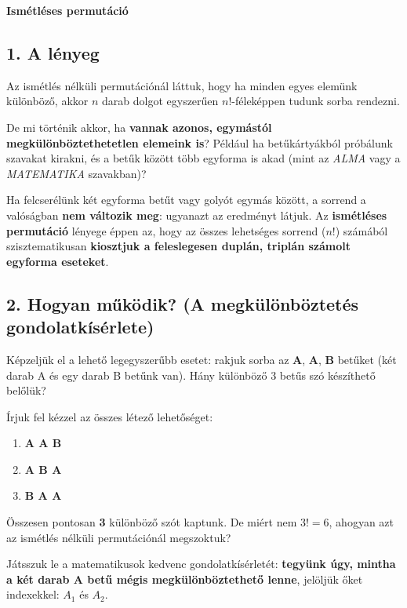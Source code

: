 \documentclass[11pt, a4paper]{article}
\begin{document}
\begin{center}
    \LARGE \textbf{Ismétléses permutáció} \\
    \vspace{0.5cm}
\end{center}

\vspace{0.3cm}

\subsection*{1. A lényeg}
Az ismétlés nélküli permutációnál láttuk, hogy ha minden egyes elemünk különböző, akkor $n$ darab dolgot egyszerűen $n!$-féleképpen tudunk sorba rendezni.

De mi történik akkor, ha \textbf{vannak azonos, egymástól megkülönböztethetetlen elemeink is}? Például ha betűkártyákból próbálunk szavakat kirakni, és a betűk között több egyforma is akad (mint az \textit{ALMA} vagy a \textit{MATEMATIKA} szavakban)?

Ha felcserélünk két egyforma betűt vagy golyót egymás között, a sorrend a valóságban \textbf{nem változik meg}: ugyanazt az eredményt látjuk. Az \textbf{ismétléses permutáció} lényege éppen az, hogy az összes lehetséges sorrend ($n!$) számából szisztematikusan \textbf{kiosztjuk a feleslegesen duplán, triplán számolt egyforma eseteket}.

\subsection*{2. Hogyan működik? (A megkülönböztetés gondolatkísérlete)}
Képzeljük el a lehető legegyszerűbb esetet: rakjuk sorba az \textbf{A}, \textbf{A}, \textbf{B} betűket (két darab A és egy darab B betűnk van). Hány különböző 3 betűs szó készíthető belőlük? 

Írjuk fel kézzel az összes létező lehetőséget:
\begin{enumerate}
    \item \textbf{A A B}
    \item \textbf{A B A}
    \item \textbf{B A A}
\end{enumerate}
Összesen pontosan \textbf{3} különböző szót kaptunk. De miért nem $3! = 6$, ahogyan azt az ismétlés nélküli permutációnál megszoktuk?

Játsszuk le a matematikusok kedvenc gondolatkísérletét: \textbf{tegyünk úgy, mintha a két darab A betű mégis megkülönböztethető lenne}, jelöljük őket indexekkel: $A_1$ és $A_2$.
\end{document}
